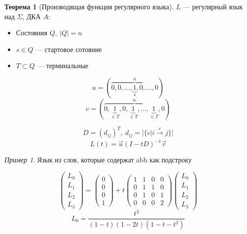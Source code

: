 \documentclass[oneside]{book}
\theoremstyle{plain}
\theoremstyle{remark}
\newtheorem*{examp}{Пример}
\theoremstyle{definition}
\newtheorem{theorem}{Теорема}[section]
\begin{document}
\begin{theorem}[Производящая функция регулярного языка]
\(L\) --- регулярный язык над \(\Sigma\), ДКА \(A\): \\
\begin{itemize}
\item Состояния \(Q,\ |Q| = n\)
\item \(s \in Q\) --- стартовое сотояние
\item \(T \subset Q\) --- терминальные
\end{itemize}
\[ u = (\overbrace{0, 0, \dots, \underbrace{1}_s, 0, \dots, 0}^n) \]
\[ v = (\overbrace{0, \underbrace{1}_{\in T}, 0, \underbrace{1}_{\in T}, \dots, \underbrace{1}_{\in T}, 0}^n) \]

\[ D = (d_{ij})^T,\ d_{ij} = |\{c | i \xrightarrow[]{c} j\}| \]
\[ L(t) = \vec{u}(I - tD)^{-1}\vec{v} \]
\end{theorem}
\begin{examp}
Язык из слов, которые содержат abb как подстроку \\
\begin{center}
\end{center}
\[ \begin{pmatrix} L_0 \\ L_1 \\ L_2 \\ L_3\end{pmatrix}  = \begin{pmatrix}0 \\ 0 \\ 0 \\ 1\end{pmatrix} + t \begin{pmatrix}1 & 1 & 0 & 0 \\ 0 & 1 & 1 & 0 \\ 0 & 1 & 0 & 1 \\ 0 & 0 & 0 & 2\end{pmatrix}\begin{pmatrix}L_0 \\ L_1 \\ L_2 \\ L_3\end{pmatrix}\]
\[ L_0 = \frac{t^3}{(1 - t)(1 - 2t)(1 - t - t^2)} \]
\end{examp}
\end{document}
